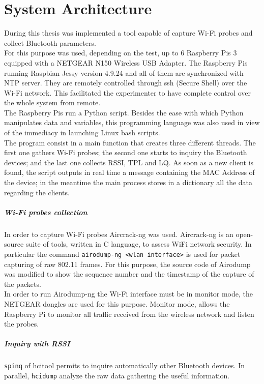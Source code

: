 \chapter{System Architecture}
\label{Chapter 4}
\thispagestyle{empty}
During this thesis was implemented a tool capable of capture Wi-Fi probes and collect Bluetooth parameters.\\
For this purpose was used, depending on the test, up to 6 Raspberry Pis 3 equipped with a NETGEAR N150 Wireless USB Adapter. The Raspberry Pis running Raspbian Jessy version 4.9.24 and all of them are synchronized with NTP server. They are remotely controlled through ssh (Secure Shell) over the Wi-Fi network. This facilitated the experimenter to have complete control over the whole system from remote.\\
\linebreak
The Raspberry Pis run a Python script. Besides the ease with which Python manipulates data and variables, this programming language was also used in view of the immediacy in launching Linux bash scripts.\\
\linebreak
The program consist in a main function that creates three different threads. The first one gathers Wi-Fi probes; the second one starts to inquiry the Bluetooth devices; and the last one collects RSSI, TPL and LQ. As soon as a new client is found, the script outputs in real time a message containing the MAC Address of the device; in the meantime the main process stores in a dictionary all the data regarding the clients.

\paragraph{Wi-Fi probes collection}
In order to capture Wi-Fi probes Aircrack-ng was used. Aircrack-ng is an open-source suite of tools, written in C language, to assess WiFi network security. In particular the command \texttt{airodump-ng \textless wlan interface\textgreater} is used for packet capturing of raw 802.11 frames. For this purpose, the source code of Airodump was modified to show the sequence number and the timestamp of the capture of the packets.\\
In order to run Airodump-ng the Wi-Fi interface must be in monitor mode, the NETGEAR dongles are used for this purpose. Monitor mode, allows the Raspberry Pi to monitor all traffic received from the wireless network and listen the probes.


\paragraph{Inquiry with RSSI}
\texttt{spinq} of hcitool permits to inquire automatically other Bluetooth devices. In parallel, \texttt{hcidump} analyze the raw data gathering the useful information. 

